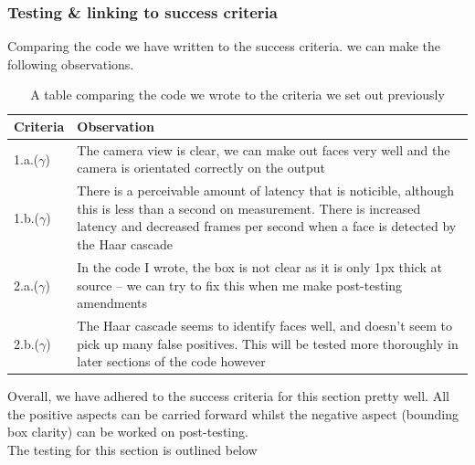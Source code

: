 \documentclass[9pt]{article}
\begin{document}
\subsubsection{Testing \& linking to success criteria}
Comparing the code we have written to the success criteria. we can make the following observations.
\begin{table}[H]
	\centering
	\begin{tabularx}{\textwidth}{lX}
		\textbf{Criteria} & \textbf{Observation}                                                                                                                                                                                                   \\ \midrule
		1.a.($ \gamma $)  & The camera view is clear, we can make out faces very well and the camera is orientated correctly on the output                                                                                                         \\
		1.b.($ \gamma $)  & There is a perceivable amount of latency that is noticible, although this is less than a second on measurement. There is increased latency and decreased frames per second when a face is detected by the Haar cascade \\
		2.a.($ \gamma $)  & In the code I wrote, the box is not clear as it is only 1px thick at source -- we can try to fix this when me make post-testing amendments                                                                             \\
		2.b.($ \gamma $)  & The Haar cascade seems to identify faces well, and doesn't seem to pick up many false positives. This will be tested more thoroughly in later sections of the code however \\ \bottomrule
	\end{tabularx}
	\caption{A table comparing the code we wrote to the criteria we set out previously}
	\label{tab_successCameraTest}
\end{table}
Overall, we have adhered to the success criteria for this section pretty well. All the positive aspects can be carried forward whilst the negative aspect (bounding box clarity) can be worked on post-testing.\\
The testing for this section is outlined below
\end{document}
